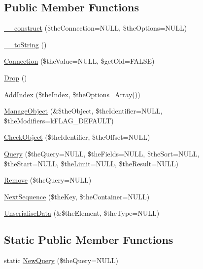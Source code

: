 \subsection*{Public Member Functions}
\begin{DoxyCompactItemize}
\item 
\hyperlink{class_c_mongo_container_aa2d654b7d2fdddbcb62c52fc8544bb58}{\-\_\-\-\_\-construct} (\$the\-Connection=N\-U\-L\-L, \$the\-Options=N\-U\-L\-L)
\item 
\hyperlink{class_c_mongo_container_abc325eae251667da577efdb45a7d3c17}{\-\_\-\-\_\-to\-String} ()
\item 
\hyperlink{class_c_mongo_container_af3902402e22a90dfcc028b5cfe3eb2e2}{Connection} (\$the\-Value=N\-U\-L\-L, \$get\-Old=F\-A\-L\-S\-E)
\item 
\hyperlink{class_c_mongo_container_a4eecd91ff10c3f0b012f61a02c049019}{Drop} ()
\item 
\hyperlink{class_c_mongo_container_a8931f51d68e4b7a522808d752b582ba5}{Add\-Index} (\$the\-Index, \$the\-Options=Array())
\item 
\hyperlink{class_c_mongo_container_a7fdadf59d9fb17c56a044353cf4bdff0}{Manage\-Object} (\&\$the\-Object, \$the\-Identifier=N\-U\-L\-L, \$the\-Modifiers=k\-F\-L\-A\-G\-\_\-\-D\-E\-F\-A\-U\-L\-T)
\item 
\hyperlink{class_c_mongo_container_a3c173dfe475cefc0c06c834ac0e2e524}{Check\-Object} (\$the\-Identifier, \$the\-Offset=N\-U\-L\-L)
\item 
\hyperlink{class_c_mongo_container_aba1884d8719bb9107250c3d43b7798b3}{Query} (\$the\-Query=N\-U\-L\-L, \$the\-Fields=N\-U\-L\-L, \$the\-Sort=N\-U\-L\-L, \$the\-Start=N\-U\-L\-L, \$the\-Limit=N\-U\-L\-L, \$the\-Result=N\-U\-L\-L)
\item 
\hyperlink{class_c_mongo_container_a7cf34a5efd5dbccffaaf2d2522b1ffcf}{Remove} (\$the\-Query=N\-U\-L\-L)
\item 
\hyperlink{class_c_mongo_container_a644b31ce3fe646dccb3d77e9bc13194e}{Next\-Sequence} (\$the\-Key, \$the\-Container=N\-U\-L\-L)
\item 
\hyperlink{class_c_mongo_container_a35906d30526846445ed8388f33102752}{Unserialise\-Data} (\&\$the\-Element, \$the\-Type=N\-U\-L\-L)
\end{DoxyCompactItemize}
\subsection*{Static Public Member Functions}
\begin{DoxyCompactItemize}
\item 
static \hyperlink{class_c_mongo_container_a01c2948c6d1c9be612a70cc6739def52}{New\-Query} (\$the\-Query=N\-U\-L\-L)
\end{DoxyCompactItemize}
